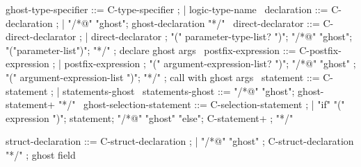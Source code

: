 \begin{syntax}

  ghost-type-specifier ::= C-type-specifier ;
  | {logic-type-name} \
  declaration ::= C-declaration ;
  | "/*@" "ghost";
     ghost-declaration "*/" \
  direct-declarator ::= C-direct-declarator ;
    | direct-declarator ;
    "(" parameter-type-list? ")";
        {"/*@" "ghost"};
          {"("parameter-list")"};
          {"*/"} ; declare ghost args
        \
  postfix-expression ::= C-postfix-expression ;
    | postfix-expression ;
     "(" argument-expression-list? ")";
     {"/*@" "ghost"} ;
     {  "(" argument-expression-list ")"};
     {  "*/"} ; call with ghost args
    \
  statement ::= C-statement ;
             | statements-ghost \
  statements-ghost ::= "/*@" "ghost";
                       ghost-statement+ "*/" \
  ghost-selection-statement ::= C-selection-statement ;
    | "if" "(" expression ")";
       statement;
      {"/*@" "ghost" "else"};
      {  C-statement+ };
      {  "*/"} \

  struct-declaration ::= C-struct-declaration ;
  | {"/*@" "ghost" };
    {C-struct-declaration "*/"} ; ghost field

\end{syntax}

